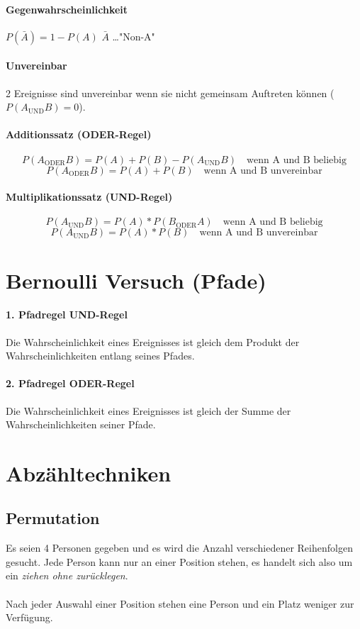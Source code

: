 \documentclass{school}
\begin{document}
\paragraph{Gegenwahrscheinlichkeit} $P(\bar{A}) = 1 - P(A)$ \quad $\bar{A}$ \quad \dots \quad "Non-A"

\paragraph{Unvereinbar} 2 Ereignisse sind unvereinbar wenn sie nicht gemeinsam Auftreten können ($P(A_{\text{UND}}B) = 0$).

\paragraph{Additionssatz \small{(ODER-Regel)}}
$$P(A_{\text{ODER}}B) = P(A) + P(B) - P(A_{\text{UND}}B) \quad \text{wenn A und B beliebig}$$
$$P(A_{\text{ODER}}B) = P(A) + P(B) \quad \text{wenn A und B unvereinbar}$$

\paragraph{Multiplikationssatz \small{(UND-Regel)}}
$$P(A_{\text{UND}}B) = P(A) * P(B_{\text{ODER}}A) \quad \text{wenn A und B beliebig}$$
$$P(A_{\text{UND}}B) = P(A) * P(B) \quad \text{wenn A und B unvereinbar}$$

\section{Bernoulli Versuch \normalsize{(Pfade)}}
\paragraph{1. Pfadregel \small{UND-Regel}} Die Wahrscheinlichkeit eines Ereignisses ist gleich dem Produkt der Wahrscheinlichkeiten entlang seines Pfades.
\paragraph{2. Pfadregel \small{ODER-Regel}} Die Wahrscheinlichkeit eines Ereignisses ist gleich der Summe der Wahrscheinlichkeiten seiner Pfade.

\section{Abzähltechniken}
\subsection{Permutation}
Es seien 4 Personen gegeben und es wird die Anzahl verschiedener Reihenfolgen gesucht. Jede Person kann nur an einer Position stehen, es handelt sich also um ein \textit{ziehen ohne zurücklegen}.
\\\\
Nach jeder Auswahl einer Position stehen eine Person und ein Platz weniger zur Verfügung.
\end{document}
